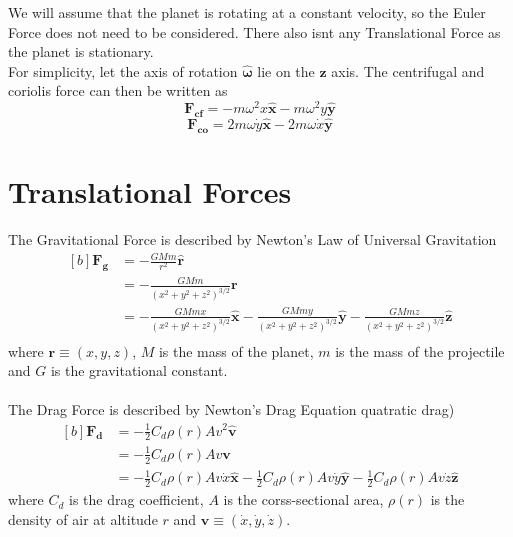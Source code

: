 \documentclass[12pt]{article}
\newcommand{\bs}[1]{\boldsymbol{#1}}
\newcommand{\om}{\omega}
\begin{document}
We will assume that the planet is rotating at a constant velocity, so the Euler Force does not need to be considered. There also isnt any Translational Force as the planet is stationary.\\
For simplicity, let the axis of rotation $\bs{\hat{\om}}$ lie on the $\bs{z}$ axis. The centrifugal and coriolis force can then be written as 
\begin{equation} \bs{F_{cf}} = -m\om^2x\bs{\hat{x}} - m\om^2y\bs{\hat{y}} \end{equation}
\begin{equation} \bs{F_{co}} = 2m\om\dot{y}\bs{\hat{x}} - 2m\om\dot{x}\bs{\hat{y}}\end{equation}

\section{Translational Forces}
The Gravitational Force is described by Newton's Law of Universal Gravitation
\begin{equation}
\begin{aligned}[b]
\bs{F_g} &= -\frac{GMm}{r^2}\bs{\hat{r}}\\
&= -\frac{GMm}{\left(x^2+y^2+z^2\right)^{3/2}}\bs{r}\\
&= -\frac{GMmx}{\left(x^2+y^2+z^2\right)^{3/2}}\bs{\hat{x}} -\frac{GMmy}{\left(x^2+y^2+z^2\right)^{3/2}}\bs{\hat{y}} -\frac{GMmz}{\left(x^2+y^2+z^2\right)^{3/2}}\bs{\hat{z}}\\
\end{aligned}
\end{equation}
where $\bs{r} \equiv \left(x, y, z\right)$, $M$ is the mass of the planet, $m$ is the mass of the projectile and $G$ is the gravitational constant.\\
\\
The Drag Force is described by Newton's Drag Equation quatratic drag)
\begin{equation}
\begin{aligned}[b]
\bs{F_d} &= -\frac{1}{2}C_d\rho\left(r\right)Av^2\bs{\hat{v}}\\
&= -\frac{1}{2}C_d\rho\left(r\right)Av\bs{v}\\
&= -\frac{1}{2}C_d\rho\left(r\right)Av\dot{x}\bs{\hat{x}} - \frac{1}{2}C_d\rho\left(r\right)Av\dot{y}\bs{\hat{y}} - \frac{1}{2}C_d\rho\left(r\right)Av\dot{z}\bs{\hat{z}}
\end{aligned}
\end{equation}
where $C_d$ is the drag coefficient, $A$ is the corss-sectional area, $\rho\left(r\right)$ is the density of air at altitude $r$ and $\bs{v} \equiv \left(\dot{x}, \dot{y}, \dot{z}\right)$.
\end{document}
